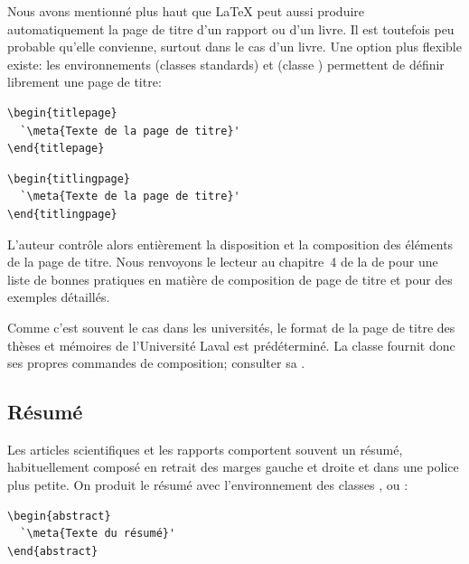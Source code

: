 Nous avons mentionné plus haut que {\LaTeX} peut aussi produire
automatiquement la page de titre d'un rapport ou d'un livre. Il est
toutefois peu probable qu'elle convienne, surtout dans le cas d'un
livre. Une option plus flexible existe: les environnements
 (classes standards) et  (classe
) permettent de définir librement une page de
titre:
\begin{demo}
  \begin{minipage}{0.48\linewidth}
\begin{lstlisting}
\begin{titlepage}
  `\meta{Texte de la page de titre}'
\end{titlepage}
\end{lstlisting}
  \end{minipage}
  \hfill
  \begin{minipage}{0.48\linewidth}
\begin{lstlisting}
\begin{titlingpage}
  `\meta{Texte de la page de titre}'
\end{titlingpage}
\end{lstlisting}
  \end{minipage}
\end{demo}
L'auteur contrôle alors entièrement la disposition et la
composition des éléments de la page de titre. Nous renvoyons le
lecteur au chapitre~4 de la %
de  pour une liste de bonnes pratiques en matière de
composition de page de titre et pour des exemples détaillés.

Comme c'est souvent le cas dans les universités, le format de la page
de titre des thèses et mémoires de l'Université Laval est
prédéterminé. La classe  fournit donc ses propres
commandes de composition; consulter sa %
.

\subsection{Résumé}
\label{sec:organisation:parties:resume}

Les articles scientifiques et les rapports comportent souvent un
résumé, habituellement composé en retrait des marges gauche et droite
et dans une police plus petite. On produit le résumé avec
l'environnement  des classes ,
 ou :
\begin{lstlisting}
\begin{abstract}
  `\meta{Texte du résumé}'
\end{abstract}
\end{lstlisting}

